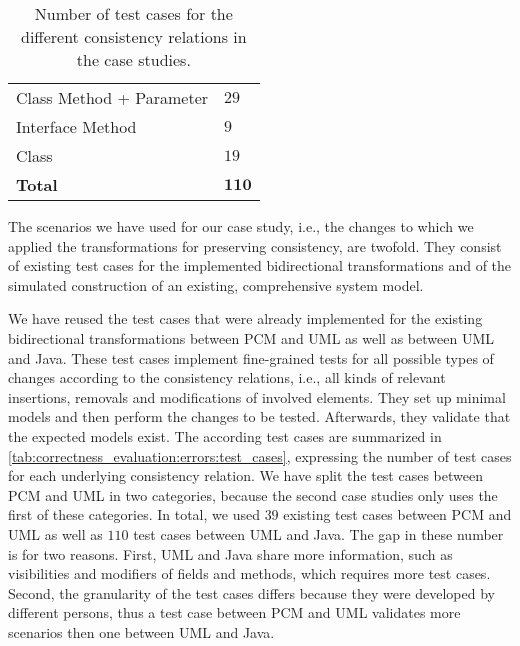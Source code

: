 \begin{table}
\begin{tabular}{L{13em}C{8em}}
        Class Method + Parameter    & $29$ \\
        Interface Method            & $9$ \\
        Class                       & $19$ \\%
        \textbf{Total}              & $\mathbf{110}$ \\
        \bottomrule
    \end{tabular}
    \caption[Number of test cases for case studies]{Number of test cases for the different consistency relations in the case studies.} %
    \label{tab:correctness_evaluation:errors:test_cases}
\end{table}

The scenarios we have used for our case study, i.e., the changes to which we applied the transformations for preserving consistency, are twofold.
They consist of existing test cases for the implemented bidirectional transformations and of the simulated construction of an existing, comprehensive system model.

We have reused the test cases that were already implemented for the existing bidirectional transformations between \gls{PCM} and \gls{UML} as well as between \gls{UML} and Java.
These test cases implement fine-grained tests for all possible types of changes according to the consistency relations, i.e., all kinds of relevant insertions, removals and modifications of involved elements.
They set up minimal models and then perform the changes to be tested.
Afterwards, they validate that the expected models exist.
The according test cases are summarized in \autoref{tab:correctness_evaluation:errors:test_cases}, expressing the number of test cases for each underlying consistency relation.
We have split the test cases between \gls{PCM} and \gls{UML} in two categories, because the second case studies only uses the first of these categories.
In total, we used $39$ existing test cases between \gls{PCM} and \gls{UML} as well as $110$ test cases between \gls{UML} and Java.
The gap in these number is for two reasons. First, \gls{UML} and Java share more information, such as visibilities and modifiers of fields and methods, which requires more test cases. Second, the granularity of the test cases differs because they were developed by different persons, thus a test case between \gls{PCM} and \gls{UML} validates more scenarios then one between \gls{UML} and Java.

